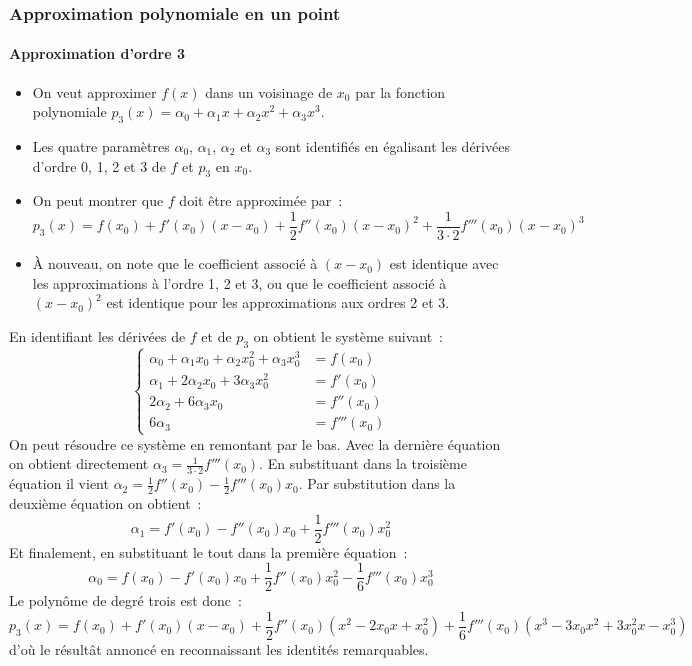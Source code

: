 \documentclass[10pt,notheorems]{beamer}
\theoremstyle{plain}
\theoremstyle{definition} %
\begin{document}
\begin{frame}
  \frametitle{Approximation polynomiale en un point}
  \framesubtitle{Approximation d'ordre 3}
  \hypertarget{slide_taylor_6}{}

  \bigskip

  \begin{itemize}

  \item On veut approximer $f(x)$ dans un voisinage de $x_0$ par la fonction polynomiale $p_3(x) = \alpha_0+\alpha_1 x + \alpha_2 x^2 + \alpha_3 x^3$.\newline

  \item Les quatre paramètres $\alpha_0$, $\alpha_1$, $\alpha_2$ et $\alpha_3$ sont identifiés en égalisant les dérivées d'ordre 0, 1, 2 et 3 de $f$ et $p_3$ en $x_0$.\newline

  \item On peut montrer que $f$ doit être approximée par~:
    \[
      p_3(x) = f(x_0) + f'(x_0)(x-x_0) + \frac{1}{2}f''(x_0)(x-x_0)^2 + \frac{1}{3\cdot 2}f'''(x_0)(x-x_0)^3
    \]

    \medskip

  \item À nouveau, on note que le coefficient associé à $(x-x_0)$ est identique avec les approximations à l'ordre 1, 2 et 3, ou que le coefficient associé à $(x-x_0)^2$ est identique pour les approximations aux ordres 2 et 3.

  \end{itemize}

\end{frame}


\begin{notes}
  En identifiant les dérivées de $f$ et de $p_3$ on obtient le système suivant~:
  \[
    \begin{cases}
      \alpha_0+\alpha_1x_0+\alpha_2x_0^2 +\alpha_3x_0^3&= f(x_0)\\
      \alpha_1+2\alpha_2x_0+3\alpha_3 x_0^2 &= f'(x_0)\\
      2\alpha_2+6\alpha_3 x_0 &= f''(x_0)\\
      6\alpha_3 &= f'''(x_0)
    \end{cases}
  \]
  On peut résoudre ce système en remontant par le bas. Avec la dernière équation on obtient directement $\alpha_3 = \frac{1}{3\cdot 2}f'''(x_0)$. En substituant dans la troisième équation il vient $\alpha_2 = \frac{1}{2}f''(x_0)-\frac{1}{2}f'''(x_0)x_0$. Par substitution dans la deuxième équation on obtient~:
  \[
    \alpha_1 = f'(x_0)-f''(x_0)x_0+\frac{1}{2}f'''(x_0)x_0^2
  \]
  Et finalement, en substituant le tout dans la première équation~:
  \[
    \alpha_0 = f(x_0)-f'(x_0)x_0+\frac{1}{2}f''(x_0)x_0^2-\frac{1}{6}f'''(x_0)x_0^3
  \]
  Le polynôme de degré trois est donc~:
  \[
    p_3(x) = f(x_0)+f'(x_0)(x-x_0)+\frac{1}{2}f''(x_0)(x^2-2x_0x+x_0^2)+\frac{1}{6}f'''(x_0)(x^3-3x_0x^2+3x_0^2x-x_0^3)
  \]
  d'où le résultât annoncé en reconnaissant les identités remarquables.
\end{notes}
\end{document}
